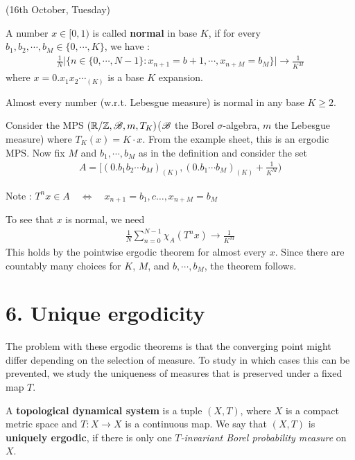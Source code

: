 \documentclass[10pt,a4paper]{report}
\newenvironment{proof}
{\begin{changemargin}{1cm}{0.5cm} 
	}%
	{\end{changemargin}
}
\begin{document}
\newday

(16th October, Tuesday)
\s

 A number $x\in [0,1)$ is called \textbf{normal} in base $K$, if for every $b_1, b_2, \cdots, b_M \in \{0,\cdots, K\}$, we have :
\begin{align*}
\frac{1}{N} \big| \{ n\in \{0,\cdots, N-1\}: x_{n+1} = b+1, \cdots, x_{n+M}= b_M  \} \big| \rightarrow \frac{1}{K^M}
\end{align*}
where $x = 0.x_1x_2\cdots_{(K)}$ is a base $K$ expansion.
\s

\thm Almost every number (w.r.t. Lebesgue measure) is normal in any base $K\geq 2$. 
\begin{proof}
\pf Consider the MPS $(\mathbb{R}/ \mathbb{Z},\mathscr{B}, m, T_K)$($\mathscr{B}$ the Borel $\sigma$-algebra, $m$ the Lebesgue measure) where $T_K(x) = K\cdot x$. From the example sheet, this is an ergodic MPS. Now fix $M$ and $b_1, \cdots, b_M$ as in the definition and consider the set
\begin{align*}
A = \Big[ (0.b_1 b_2 \cdots b_M)_{(K)}, (0.b_1\cdots b_M)_{(K)} + \frac{1}{K^M} \Big)
\end{align*}

\bull Note : $T^n x\in A \quad \Leftrightarrow \quad x_{n+1} = b_1, c\dots, x_{n+M} = b_M$

To see that $x$ is normal, we need
\begin{align*}
\frac{1}{N} \sum_{n=0}^{N-1} \chi_A(T^n x) \rightarrow \frac{1}{K^M}
\end{align*}
This holds by the pointwise ergodic theorem for almost every $x$. Since there are countably many choices for $K$, $M$, and $b,\cdots,b_M$, the theorem follows.

\eop
\end{proof}
\s

\section*{6. Unique ergodicity}

The problem with these ergodic theorems is that the converging point might differ depending on the selection of measure. To study in which cases this can be prevented, we study the uniqueness of measures that is preserved under a fixed map $T$.

\s
{} A \textbf{topological dynamical system} is a tuple $(X,T)$, where $X$ is a compact metric space and $T:X\rightarrow X$ is a continuous map. We say that $(X,T)$ is \textbf{uniquely ergodic}, if there is only one \emph{$T$-invariant Borel probability measure} on $X$.
\s
\end{document}
